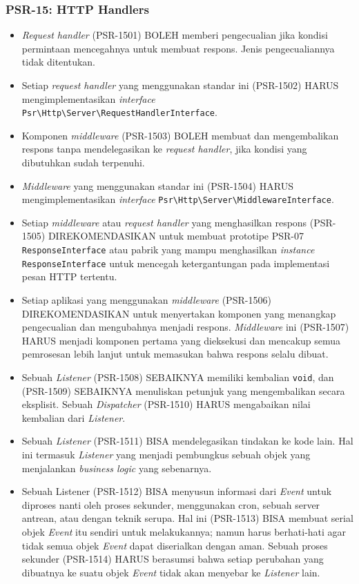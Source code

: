\subsubsection{PSR-15: HTTP Handlers}
\label{subsubsec:psr15}
\begin{itemize}
	\item \textit{Request handler} (PSR-1501) BOLEH memberi pengecualian jika kondisi permintaan mencegahnya untuk membuat respons. Jenis pengecualiannya tidak ditentukan.
	\item Setiap \textit{request handler} yang menggunakan standar ini (PSR-1502) HARUS mengimplementasikan \textit{interface} \verb|Psr\Http\Server\RequestHandlerInterface|.
	\item Komponen \textit{middleware} (PSR-1503) BOLEH membuat dan mengembalikan respons tanpa mendelegasikan ke \textit{request handler}, jika kondisi yang dibutuhkan sudah terpenuhi.
	\item \textit{Middleware} yang menggunakan standar ini (PSR-1504) HARUS mengimplementasikan \textit{interface} \verb|Psr\Http\Server\MiddlewareInterface|.
	\item Setiap \textit{middleware} atau \textit{request handler} yang menghasilkan respons (PSR-1505) DIREKOMENDASIKAN untuk membuat prototipe PSR-07 \verb|ResponseInterface| atau pabrik yang mampu menghasilkan \textit{instance} \verb|ResponseInterface| untuk mencegah ketergantungan pada implementasi pesan HTTP tertentu.
	\item Setiap aplikasi yang menggunakan \textit{middleware} (PSR-1506) DIREKOMENDASIKAN untuk menyertakan komponen yang menangkap pengecualian dan mengubahnya menjadi respons. \textit{Middleware} ini (PSR-1507) HARUS menjadi komponen pertama yang dieksekusi dan mencakup semua pemrosesan lebih lanjut untuk memasukan bahwa respons selalu dibuat. 
	\item Sebuah \textit{Listener} (PSR-1508) SEBAIKNYA memiliki kembalian \verb|void|, dan (PSR-1509) SEBAIKNYA menuliskan petunjuk yang mengembalikan secara eksplisit. Sebuah \textit{Dispatcher} (PSR-1510) HARUS mengabaikan nilai kembalian dari \textit{Listener}.
	\item Sebuah \textit{Listener} (PSR-1511) BISA mendelegasikan tindakan ke kode lain. Hal ini termasuk \textit{Listener} yang menjadi pembungkus sebuah objek yang menjalankan \textit{business logic} yang sebenarnya.
	\item Sebuah Listener (PSR-1512) BISA menyusun informasi dari \textit{Event} untuk diproses nanti oleh proses sekunder, menggunakan cron, sebuah server antrean, atau dengan teknik serupa. Hal ini (PSR-1513) BISA membuat serial objek \textit{Event} itu sendiri untuk melakukannya; namun harus berhati-hati agar tidak semua objek \textit{Event} dapat diserialkan dengan aman. Sebuah proses sekunder (PSR-1514) HARUS berasumsi bahwa setiap perubahan yang dibuatnya ke suatu objek \textit{Event} tidak akan menyebar ke \textit{Listener} lain. 
\end{itemize}

